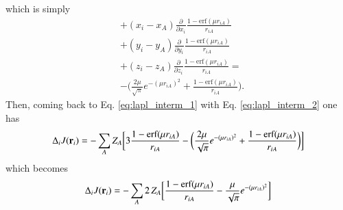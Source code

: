 \documentclass[aip,jcp,reprint,noshowkeys,superscriptaddress]{revtex4-1}
\newcommand{\deriv}[3]{\frac{\partial^{#3} #1}{\partial {#2}^{#3}}}
\newcommand{\br}[0]{{\bf {r}}}
\begin{document}
which is simply 
\begin{equation}
 \begin{aligned}
 \label{eq:lapl_interm_2}
 & + (x_i - x_A) \deriv{}{x_i}{}\frac{1 - \text{erf}(\mu r_{iA})}{r_{iA}} \\ 
 & + (y_i - y_A) \deriv{}{y_i}{}\frac{1 - \text{erf}(\mu r_{iA})}{r_{iA}} \\ 
 & + (z_i - z_A) \deriv{}{z_i}{}\frac{1 - \text{erf}(\mu r_{iA})}{r_{iA}}  = \\
 &- \bigg( \frac{2 \mu}{\sqrt{\pi}} e^{-(\mu r_{iA})^2} + \frac{1 - \text{erf}(\mu r_{iA})}{r_{iA}}\bigg).
 \end{aligned}
\end{equation}
Then, coming back to Eq. \eqref{eq:lapl_interm_1} with Eq. \eqref{eq:lapl_interm_2} one has 
\begin{equation}
 \Delta_i J(\br{}_i) = - \sum_{A}  Z_A \bigg[ 3 \frac{1 - \text{erf}(\mu r_{iA})}{r_{iA}}  - \bigg( \frac{2 \mu}{\sqrt{\pi}} e^{-(\mu r_{iA})^2} + \frac{1 - \text{erf}(\mu r_{iA})}{r_{iA}}\bigg) \bigg]
\end{equation}
which becomes 
\begin{equation}
 \Delta_i J(\br{}_i) = - \sum_{A}  2 \, Z_A  \bigg[ \frac{1 - \text{erf}(\mu r_{iA})}{r_{iA}}  - \frac{\mu}{\sqrt{\pi}} e^{-(\mu r_{iA})^2}  \bigg]
\end{equation}
\end{document}
